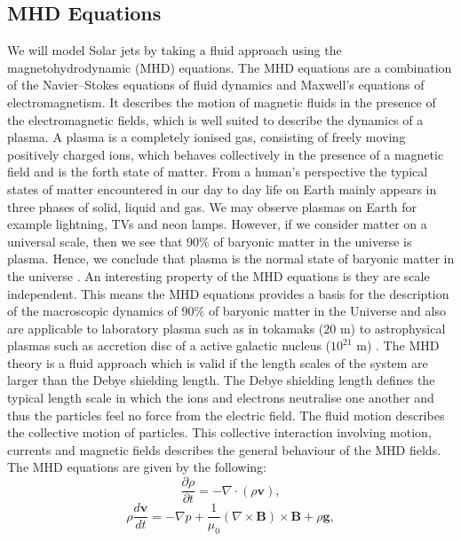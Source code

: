 \documentclass[12pt,a4paper,twoside]{article}
\begin{document}
\subsection{MHD Equations} 
We will model Solar jets by taking a fluid approach using the magnetohydrodynamic (MHD) equations. The MHD equations are a combination of the Navier$–$Stokes equations of fluid dynamics and  Maxwell's equations of electromagnetism. It describes the motion of magnetic fluids in the presence of the electromagnetic fields, which is well suited to describe the dynamics of a plasma. A plasma is a completely ionised gas, consisting of freely moving positively charged ions, which behaves collectively in the presence of a magnetic field and is the forth state of matter. From a human's perspective the typical states of matter encountered in our day to day life on Earth mainly appears in three phases of solid, liquid and gas. We may observe plasmas on Earth for example lightning, TVs and neon lamps. However, if we consider matter on a universal scale, then we see that $90 \%$ of baryonic matter in the universe is plasma. Hence, we conclude that plasma is the normal state of baryonic matter in the universe \citep{goedbloed2004principles}. An interesting property of the MHD equations is they are scale independent. This means the MHD equations provides a basis for the description of the macroscopic dynamics of $90 \%$ of baryonic matter in the Universe and also are applicable to laboratory plasma such as in tokamaks ($20$ m) to astrophysical plasmas such as accretion disc of a active galactic nucleus ($10^{21}$  m) \citep{goedbloed2004principles}. The MHD theory is a fluid approach which is valid if the length scales of the system are larger than the Debye shielding length. The Debye shielding length defines the typical length scale in which the ions and electrons neutralise one another and thus the particles feel no force from the electric field. The fluid motion describes the collective motion of particles. This collective interaction involving motion, currents and magnetic fields describes the general behaviour of the MHD fields. The MHD equations are given by the following:      
\begin{equation}\label{eq86}
\frac{\partial \rho}{\partial t} = - \nabla \cdot (\rho \boldsymbol{v}),
\end{equation}
\begin{equation}\label{eq87}
\rho \frac{d \boldsymbol{v}}{dt} = - \nabla p + \frac{1}{\mu_0} (\nabla \times \boldsymbol{B}) \times \boldsymbol{B} + \rho \boldsymbol{g},
\end{equation}
\end{document}
